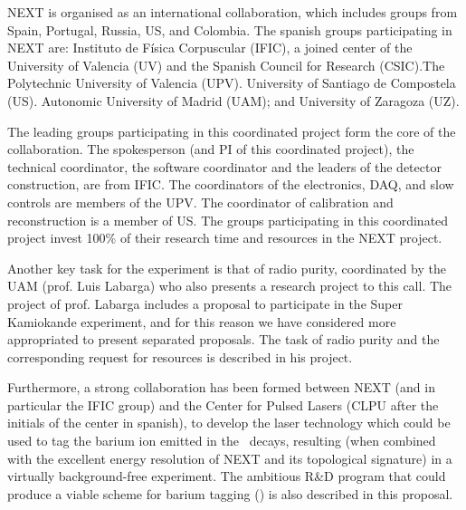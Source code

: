 NEXT is organised as an international collaboration, which includes groups from Spain, Portugal, Russia, US, and Colombia. The spanish groups participating in NEXT are: Instituto de Física Corpuscular (IFIC), a joined center of the University of Valencia (UV) and the Spanish Council for Research (CSIC).The  Polytechnic University of Valencia (UPV). University of Santiago de Compostela (US). Autonomic University of Madrid (UAM); and University of Zaragoza (UZ). 

The leading groups participating in this coordinated project form the core of the collaboration. The spokesperson (and PI of this coordinated project), the technical coordinator, the software coordinator and the leaders of the detector construction, are from  IFIC. The coordinators of the electronics, DAQ, and slow controls are members of the UPV. The coordinator of calibration and reconstruction is a member of US. The groups participating in this coordinated project invest 100\% of their research time and resources in the NEXT project. 

Another key task for the experiment is that of radio purity, coordinated by the UAM (prof. Luis Labarga) who also presents a research project to this call. The project of prof. Labarga includes a proposal to participate in the Super Kamiokande experiment, and for this reason we have considered more appropriated to present separated proposals. The task of radio purity and the corresponding request for resources is described in his project.


Furthermore, a strong collaboration has been  formed between NEXT (and in particular the IFIC group) and the Center for Pulsed Lasers (CLPU after the initials of the center in spanish), to develop the laser technology which could be used to tag the barium ion emitted in the \bb\ decays, resulting (when combined with the excellent energy resolution of NEXT and its topological signature) in a virtually background-free experiment. The ambitious R\&D program that could produce a viable scheme for barium tagging (\BATA) is also described in this proposal.  
